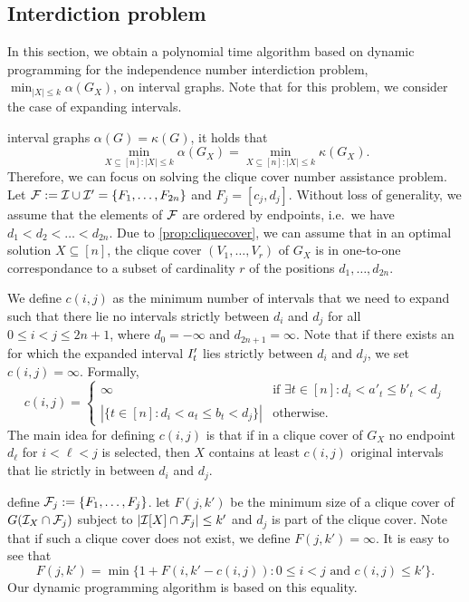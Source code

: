 \subsection{Interdiction problem}
\label{sec:independence-interdiction}
In this section, we obtain a polynomial time algorithm based on dynamic programming for the independence number interdiction problem,  $\min_{|X| \leq k} \alpha(G_X)$,
on interval graphs. Note that for this problem, we consider the case of expanding intervals.

 interval graphs $\alpha(G) = \kappa(G)$, it holds that 
\[ \min_{X \subseteq [n] \colon |X| \leq k } \alpha(G_X) = \min_{X \subseteq [n] \colon |X| \leq k} \kappa(G_X). \]
Therefore, we can focus on solving the clique cover number assistance problem.
Let $\mathcal{F} := \mathcal{I} \cup \mathcal{I}' = \{ F_1, \ldots, F_{2n} \}$ and $F_j = [c_j, d_j]$. Without loss of generality, we assume that the elements of $\mathcal{F}$ are ordered by endpoints, i.e.\ we have $d_1 < d_2 < \dots < d_{2n}$. 
Due to \cref{prop:cliquecover}, we can assume that in an optimal solution $X \subseteq [n]$, the clique cover $(V_1, \dots, V_r)$ of $G_X$ is in one-to-one correspondance to a  subset of cardinality $r$ of the
positions $d_1, \dots, d_{2n}$.

We define $c(i,j)$ 
as the minimum number of intervals that we need to expand such that there lie no 
intervals strictly between $d_i$ and $d_j$ for all $0 \leq i < j \leq 2n+1$, where $d_0=-\infty$ and $d_{2n+1} = \infty$.
Note that if there exists an  for which the expanded interval $I'_{t}$ lies strictly between $d_i$ and $d_j$, 
we set $c(i,j) = \infty$. Formally,
\[ c(i,j) = \begin{cases} \infty & \text{if } \exists t \in [n] \colon d_i < a'_t \leq b'_t < d_j\\ |\{ t \in [n] \colon d_i < a_t \leq b_t < d_j \}| & \text{otherwise}. \end{cases} \]
The main idea for defining $c(i,j)$ is that if in a clique cover of $G_X$ no 
endpoint $d_{\ell}$ for $i<\ell<j$ is selected, then $X$ contains at least $c(i,j)$ original intervals that lie strictly in between $d_i$ and $d_j$.

 define $\mathcal{F}_j := \{F_1, \dots, F_j\}$.
 let $F(j,k')$ be the minimum size of a clique cover of $G(\mathcal{I}_X \cap \mathcal{F}_j)$ subject to 
$|\mathcal{I}[X] \cap \mathcal{F}_j| \leq k'$ and $d_j$ is part of the clique cover. Note that if such a clique cover does not exist, 
we define $F(j,k')=\infty$. 
It is easy to see that
    \[ F(j,k') = \min \{ 1 + F(i, k'-c(i,j)) \colon 0 \leq i < j\text{ and } c(i,j) \leq k' \}. \]
Our dynamic programming algorithm is based on this equality.


